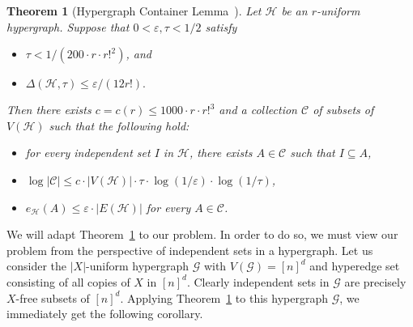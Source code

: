 \documentclass[12pt]{article}
\numberwithin{equation}{section}
\newtheorem{thm}[equation]{Theorem}
\theoremstyle{definition}
\theoremstyle{remark}
\begin{document}
\begin{thm}[Hypergraph Container Lemma~\cite{saxton}]\label{thm:saxtonthomason}Let $\mathcal{H}$ be an $r$-uniform hypergraph. Suppose that $0 < \varepsilon, \tau < 1/2$  satisfy
\begin{itemize}
    \item $\tau < 1/(200\cdot r \cdot r!^2)$, and
    \item $\Delta(\mathcal{H}, \tau) \leq \varepsilon/(12r!).$
\end{itemize} 
Then there exists $c = c(r) \leq 1000\cdot r \cdot r!^3$ and a collection $\mathcal{C}$ of subsets of $V(\mathcal{H})$ such that the following hold:

\begin{itemize}
    \item for every independent set $I$ in $\mathcal{H}$, there exists $A \in \mathcal{C}$ such that $I \subseteq A$,  
    \item $\log|\mathcal{C}| \leq c \cdot |V(\mathcal{H})| \cdot \tau \cdot \log(1/\varepsilon) \cdot \log(1/\tau)$,
    \item $e_{\mathcal{H}}(A) \leq \varepsilon \cdot |E(\mathcal{H})|$ for every $A \in \mathcal{C}$. 
\end{itemize}
\end{thm}

 We will adapt Theorem~\ref{thm:saxtonthomason} to our problem. In order to do so, we must view our problem from the perspective of independent sets in a hypergraph. Let us consider the $|X|$-uniform hypergraph $\mathcal{G}$ with $V(\mathcal{G}) = [n]^d$ and hyperedge set consisting of all copies of $X$ in $[n]^d$. Clearly independent sets in $\mathcal{G}$ are precisely $X$-free subsets of $[n]^d$. Applying Theorem~\ref{thm:saxtonthomason} to this hypergraph $\mathcal{G}$, we immediately get the following corollary.
\end{document}
